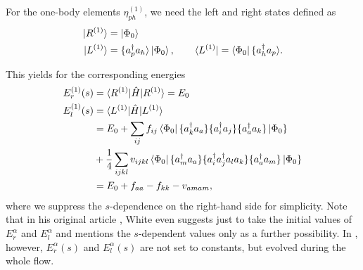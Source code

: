 For the one-body elements $\eta_{ph}^{(1)}$, we need the left and right states defined as
\begin{align*}
| R^{(1)} \rangle &= \left|\Phi_0 \right\rangle \\
| L^{(1)} \rangle &= \lbrace a_p^\dagger a_h \rangle \left| \Phi_0 \right\rangle, \qquad \langle L^{(1)}| = \left\langle \Phi_0 \right| \lbrace a_h^\dagger a_p\rangle.
\end{align*}

This yields for the corresponding energies
\begin{align*}
E_r^{(1)}(s) &= \langle R^{(1)} | \hat{H} | R^{(1)} \rangle = E_0\\
E_l^{(1)}(s) &= \langle L^{(1)} | \hat{H} | L^{(1)} \rangle \\
&= E_0 + \sum_{ij}f_{ij}\left\langle \Phi_0 \right| \lbrace a_k^\dagger a_a\rbrace \lbrace a_i^\dagger a_j \rbrace \lbrace a_a^\dagger a_k \rbrace \left| \Phi_0 \right\rbrace \\
&+ \frac{1}{4} \sum_{ijkl}v_{ijkl} \left\langle \Phi_0 \right| \lbrace a_m^\dagger a_a \rbrace \lbrace a_i^\dagger a_j^\dagger a_l a_k \rbrace \lbrace a_a^\dagger a_m\rbrace \left| \Phi_0 \right\rbrace \\
&= E_0 + f_{aa} - f_{kk} - v_{amam}, 
\end{align*}
where we suppress the $s$-dependence on the right-hand side for simplicity. Note that in his original article \cite{White:cond-mat0201346}, White even suggests just to take the initial values of $E_r^{\alpha}$ and $E_l^{\alpha}$ and mentions the $s$-dependent values only as a further possibility. In \cite{Koshi}, however, $E_r^{\alpha}(s)$ and $E_l^{\alpha}(s)$ are not set to constants, but evolved during the whole flow. 

